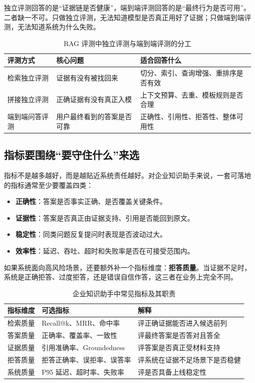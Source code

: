 独立评测回答的是“证据链是否健康”，端到端评测回答的是“最终行为是否可用”。二者缺一不可。只做独立评测，无法知道模型是否真正用好了证据；只做端到端评测，无法知道系统为什么失败。

\begin{table}[H]
\centering
\small
\begin{tabularx}{\textwidth}{>{\raggedright\arraybackslash}p{2.9cm}>{\raggedright\arraybackslash}p{3.1cm}>{\raggedright\arraybackslash}X}
\toprule
\textbf{评测方式} & \textbf{核心问题} & \textbf{适合回答什么} \\
\midrule
检索独立评测 & 证据有没有被找回来 & 切分、索引、查询增强、重排序是否有效 \\
拼接独立评测 & 正确证据有没有真正入模 & 上下文预算、去重、模板规则是否合理 \\
端到端问答评测 & 用户最终看到的答案是否可靠 & 正确性、引用性、拒答性、整体可用性 \\
\bottomrule
\end{tabularx}
\caption{RAG 评测中独立评测与端到端评测的分工}
\label{tab:eval-rag-levels}
\end{table}

\subsection{指标要围绕“要守住什么”来选}
指标不是越多越好，而是越贴近系统责任越好。对企业知识助手来说，一套可落地的指标通常至少要覆盖四类：
\begin{itemize}
  \item \textbf{正确性}：答案是否事实正确、是否覆盖关键条件。
  \item \textbf{证据性}：答案是否真正由证据支持、引用是否能回到原文。
  \item \textbf{稳定性}：同类问题反复提问时表现是否波动过大。
  \item \textbf{效率性}：延迟、吞吐、超时和失败率是否在可接受范围内。
\end{itemize}

如果系统面向高风险场景，还要额外补一个指标维度：\textbf{拒答质量}。当证据不足时，系统是正确拒答、过度拒答，还是错误自信作答，这三者在业务上完全不同。

\begin{table}[H]
\centering
\small
\begin{tabularx}{\textwidth}{>{\raggedright\arraybackslash}p{2.8cm}>{\raggedright\arraybackslash}p{3.2cm}>{\raggedright\arraybackslash}X}
\toprule
\textbf{指标维度} & \textbf{可选指标} & \textbf{解释} \\
\midrule
检索质量 & Recall@k、MRR、命中率 & 评正确证据能否进入候选前列 \\
答案质量 & 正确率、覆盖率、一致性 & 评最终答案是否答对且答全 \\
证据质量 & 引用准确率、Groundedness & 评答案是否真正受材料支持 \\
拒答质量 & 拒答正确率、误拒率、误答率 & 评系统在证据不足场景下是否稳健 \\
系统质量 & P95 延迟、超时率、失败率 & 评是否具备上线稳定性 \\
\bottomrule
\end{tabularx}
\caption{企业知识助手中常见指标及其职责}
\label{tab:eval-metrics}
\end{table}

